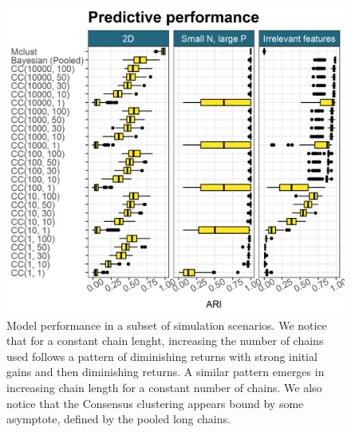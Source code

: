 \documentclass{bioinfo}
\begin{document}

\begin{figure} %
	\centering
	\includegraphics[scale=0.5]{./Images/Simulations/simulation_model_prediction.png}
	\caption{Model performance in a subset of simulation scenarios. We notice that for a constant chain lenght, increasing the number of chains used follows a pattern of diminishing returns with strong initial gains and then diminishing returns. A similar pattern emerges in increasing chain length for a constant number of chains. We also notice that the Consensus clustering appears bound by some asymptote, defined by the pooled long chains.}
	\label{fig:simResults}
\end{figure}
\end{document}
